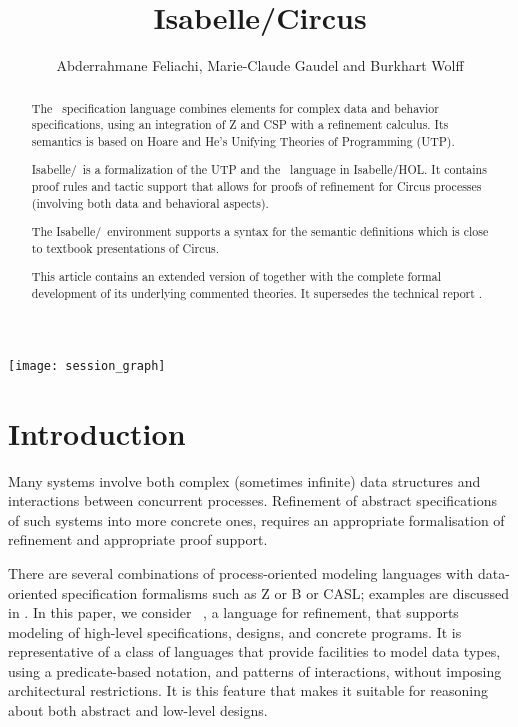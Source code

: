 \documentclass[11pt,a4paper]{article}
\begin{document}
\title{Isabelle/Circus}
\author{Abderrahmane Feliachi, Marie-Claude Gaudel and Burkhart Wolff}
\maketitle

\begin{abstract}
The \Circus\ specification language combines elements for complex data and behavior specifications, 
using an integration of Z and CSP with a refinement calculus. Its semantics is based on Hoare and He's
Unifying Theories of Programming (UTP).

Isabelle/\Circus\ is a formalization of the UTP and the \Circus\ language in Isabelle/HOL.
It contains proof rules and tactic support that allows for proofs
of refinement for Circus processes (involving both data and behavioral aspects).

The Isabelle/\Circus\ environment supports a syntax for the semantic definitions which is close to 
textbook presentations of Circus.

This article contains an extended version of \cite{DBLP:conf/vstte/FeliachiGW12} together with the 
complete  formal development of its underlying commented theories. It supersedes the technical report  
\cite{fgw11rapport-lri}. 
\end{abstract}

\tableofcontents

\begin{center}
  \texttt{[image: session\_graph]}
\end{center}

\newpage


\section{Introduction} 
Many systems involve both complex (sometimes infinite) data structures and interactions 
between concurrent processes. Refinement of abstract specifications of such systems into 
more concrete ones, requires an appropriate formalisation of 
refinement and appropriate proof support.

There are several combinations of process-oriented modeling languages
with data-oriented specification formalisms such as Z or B or CASL; examples
are discussed in \cite{Butler99csp2b:a,Fischer1998,Taguchi1997,Roggenbach:2006}.
In this paper, we consider \Circus\ \cite{WC02}, a
language for refinement, that supports modeling of high-level
specifications, designs, and concrete programs. It is representative
of a class of languages that provide facilities to model data types,
using a predicate-based notation, and patterns of interactions, without imposing 
architectural restrictions. It is this feature that makes
it suitable for reasoning about both abstract and low-level
designs. 
\end{document}
